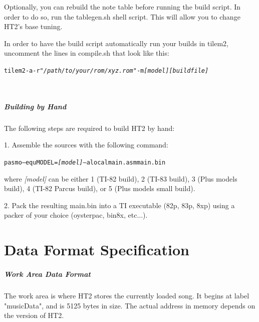 \documentclass[12pt]{report}	%
\begin{document}
\begin{appendices}
Optionally, you can rebuild the note table before running the build script. In order to do so, run the tablegen.sh shell script. This will allow you to change HT2's base tuning.

In order to have the build script automatically run your builds in tilem2, uncomment the lines in compile.sh that look like this:

\begin{alltt}
tilem2 -a -r "\emph{/path/to/your/rom/xyz.rom}" -m \emph{[model] [buildfile]}
\end{alltt} ~\\

\paragraph{Building by Hand} The following steps are required to build HT2 by hand: 

1. Assemble the sources with the following command:

\begin{alltt}
pasmo --equ MODEL=\emph{[model]} --alocal main.asm main.bin
\end{alltt}

where \emph{[model]} can be either 1 (TI-82 build), 2 (TI-83 build), 3 (Plus models build), 4 (TI-82 Parcus build), or 5 (Plus models small build).

2. Pack the resulting main.bin into a TI executable (82p, 83p, 8xp) using a packer of your choice (oysterpac, bin8x, etc...).



\chapter{Data Format Specification}

\paragraph{Work Area Data Format} The work area is where HT2 stores the currently loaded song. It begins at label "musicData", and is 5125 bytes in size. The actual address in memory depends on the version of HT2. \newline


\end{appendices}
\end{document}
